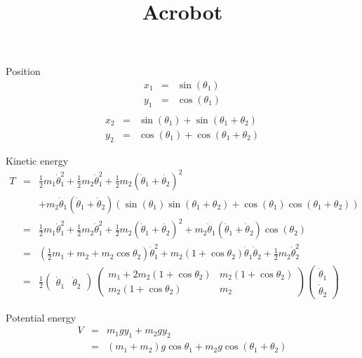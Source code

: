 \documentclass[a4paper]{article}
\title{Acrobot}
\begin{document}
\maketitle
\begin{figure}[h]
\centering
{}
\end{figure}

Position
\begin{eqnarray*}
x_1 &=& \sin(\theta_1)\\
y_1 &=& \cos(\theta_1)\\
\end{eqnarray*}
\begin{eqnarray*}
x_2 &=& \sin(\theta_1) + \sin(\theta_1 + \theta_2)\\
y_2 &=& \cos(\theta_1) + \cos(\theta_1 + \theta_2)
\end{eqnarray*}

Kinetic energy
\begin{eqnarray*}
T &=&\frac{1}{2} m_1 \dot{\theta}_1^2 + \frac{1}{2} m_2 \dot{\theta}_1^2
+ \frac{1}{2} m_2 (\dot{\theta}_1 + \dot{\theta_2})^2\\
&&+ m_2 \dot{\theta}_1(\dot{\theta}_1 + \dot{\theta}_2)
\left(\sin(\theta_1)\sin(\theta_1+\theta_2) + \cos(\theta_1)\cos(\theta_1+\theta_2)\right)\\
&=& \frac{1}{2} m_1 \dot{\theta}_1^2 + \frac{1}{2} m_2 \dot{\theta}_1^2
+ \frac{1}{2} m_2 (\dot{\theta}_1 + \dot{\theta_2})^2
+ m_2 \dot{\theta}_1(\dot{\theta}_1 + \dot{\theta}_2) \cos(\theta_2)\\
&=& (\frac{1}{2} m_1 + m_2 + m_2 \cos{\theta_2}) \dot{\theta}_1^2
+ m_2 (1 + \cos{\theta_2}) \dot{\theta}_1 \dot{\theta}_2
+ \frac{1}{2} m_2 \dot{\theta}_2^2\\
&=& \frac{1}{2}
\begin{pmatrix} \dot{\theta}_1 & \dot{\theta}_2 \end{pmatrix}\
\begin{pmatrix} m_1 + 2 m_2 (1 + \cos{\theta_2}) & m_2 (1 + \cos{\theta_2})\\
                m_2 (1 + \cos{\theta_2}) & m_2  \end{pmatrix}
\begin{pmatrix} \dot{\theta}_1\\ \dot{\theta}_2 \end{pmatrix}
\end{eqnarray*}

Potential energy
\begin{eqnarray*}
V &=& m_1 g y_1 + m_2 g y_2\\
  &=& (m_1 + m_2) g \cos{\theta_1} + m_2 g \cos(\theta_1 + \theta_2)
\end{eqnarray*}
\end{document}

